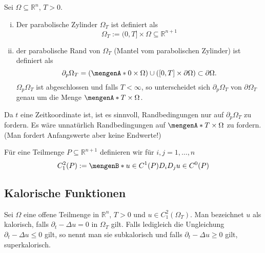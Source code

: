 \begin{definition}
	Sei $\Omega \subseteq \mathbb{R}^n$, $T >0$.
	\begin{enumerate}[(i)]
		\item Der parabolische Zylinder $\Omega_T$ ist definiert als
		\[
			\Omega_T := (0,T] \times \Omega \subseteq \mathbb{R}^{n+1}
		\]
		\item der parabolische Rand von $\Omega_T$ (Mantel vom parabolischen Zylinder) ist definiert als
		\[
			\partial_p \Omega_T = ( \set{0} \times \Omega) \cup ( [0,T] \times \partial \Omega) \subset \partial \Omega .
		\]
		$\Omega_p \Omega_T$ ist abgeschlossen und falls $T < \infty$, 
		so unterscheidet sich $\partial_p \Omega_T$ von $\partial \Omega_T$ genau um die Menge $\set{T} \times \Omega$.
	\end{enumerate}
\end{definition}

\begin{bemerkung}
	Da $t$ eine Zeitkoordinate ist, ist es sinnvoll, Randbedingungen nur auf $\partial_p \Omega_T$ zu fordern. 
	Es wäre unnatürlich Randbedingungen auf $\set{T} \times \Omega$ zu fordern. (Man fordert Anfangswerte aber keine Endwerte!)
\end{bemerkung}
Für eine Teilmenge $P \subseteq \mathbb{R}^{n+1}$ definieren wir für $i,j=1,\dots,n$ 
\[
	C^2_1(P):= \set[u \in C^1(P)]{ D_iD_j u \in C^0(P)}
\]

\subsection{Kalorische Funktionen} 
\label{sub:kalorische_funktionen}

\begin{definition}
	Sei $\Omega$ eine offene Teilmenge in $\mathbb{R}^n$, $T >0$ und $u \in C^2_1(\Omega_T)$. Man bezeichnet $u$ als kalorisch, falls $\partial_t - \Delta u =0$ in 
	$\Omega_T$ gilt. Falls ledigleich die Ungleichung $\partial_t - \Delta u \leq 0$ gilt, so nennt man sie subkalorisch und falls $\partial_t - \Delta u \geq 0$ gilt, 
	superkalorisch.
\end{definition}

